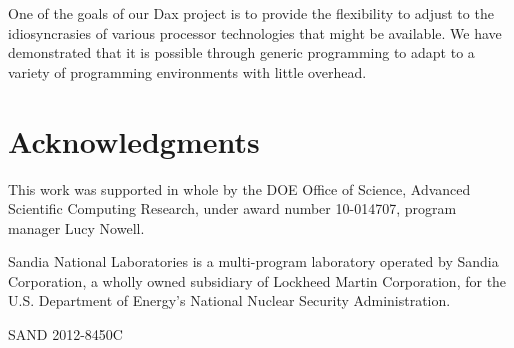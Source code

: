 \documentclass[conference]{IEEEtran}
\begin{document}
One of the goals of our Dax project is to provide the flexibility to adjust
to the idiosyncrasies of various processor technologies that might be
available.  We have demonstrated that it is possible through generic
programming to adapt to a variety of programming environments with little
overhead.

\section*{Acknowledgments}

\noindent
This work was supported in whole by the DOE Office of Science, Advanced
Scientific Computing Research, under award number 10-014707, program
manager Lucy Nowell.

Sandia National Laboratories is a multi-program laboratory operated by
Sandia Corporation, a wholly owned subsidiary of Lockheed Martin
Corporation, for the U.S. Department of Energy's National Nuclear Security
Administration.

\noindent
{\small SAND 2012-8450C}



\end{document}
